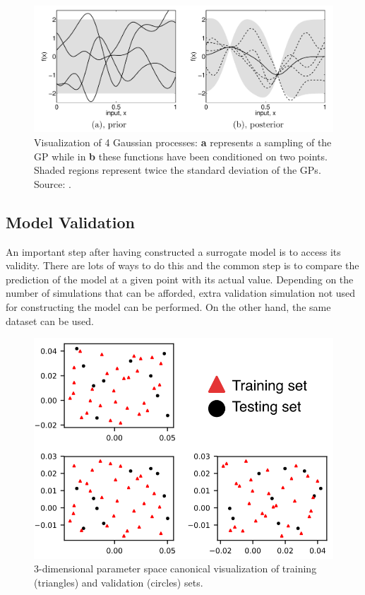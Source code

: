 \begin{figure}[!h]
\centering
\includegraphics[width=0.9\linewidth,keepaspectratio]{fig/literature/rasmussenGP.png}
\caption{Visualization of 4 Gaussian processes: \textbf{a} represents a sampling of the GP while in \textbf{b} these functions have been conditioned on two points. Shaded regions represent twice the standard deviation of the GPs. Source: \cite{rasmussen2006}.}
\label{fig:gp_prior-post}
\end{figure}



\subsection{Model Validation}\label{sec:validation}

An important step after having constructed a surrogate model is to access its validity. There are lots of ways to do this and the common step is to compare the prediction of the model at a given point with its actual value. Depending on the number of simulations that can be afforded, extra validation simulation not used for constructing the model can be performed. On the other hand, the same dataset can be used.

\begin{figure}[!h]
\centering
\includegraphics[width=0.6\linewidth,keepaspectratio]{fig/literature/validation_set.png}
\caption{3-dimensional parameter space canonical visualization of training (triangles) and validation (circles) sets.}
\label{fig:validation}
\end{figure}

